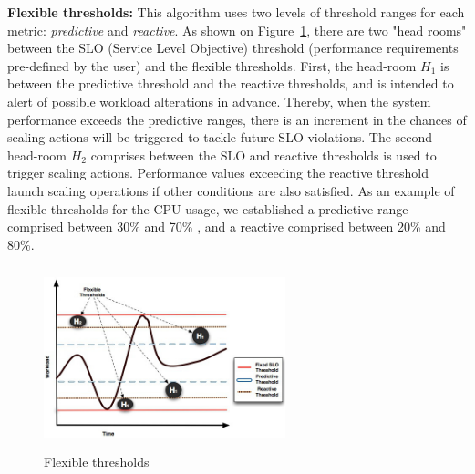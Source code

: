 \textbf{Flexible thresholds:} This algorithm uses two levels of threshold ranges for each metric: \emph{predictive} and \emph{reactive}. As shown on Figure~\ref{flexibleThresholds}, there are two "head rooms" between the SLO (Service Level Objective) threshold (performance requirements pre-defined by the user) and the flexible thresholds.  First, the head-room $H_1$ is between the predictive threshold and the reactive thresholds, and is intended to alert of possible workload alterations in advance.  Thereby, when the system performance exceeds the predictive ranges, there is an increment in the chances of scaling actions will be triggered to tackle future SLO violations. The second head-room $H_2$ comprises between the SLO and reactive thresholds is used to trigger scaling actions. Performance values exceeding the reactive threshold launch scaling operations if other conditions are also satisfied. As an example of flexible thresholds for the CPU-usage, we established a predictive range comprised between 30\% and 70\% , and a reactive comprised between 20\% and 80\%.  

\begin{figure}
\begin{center}
\includegraphics[width=7cm, height=5.3cm]{./images/thresholdGraphic.jpg}
\end{center}
\caption{Flexible thresholds}
\label{flexibleThresholds}
\end{figure}

